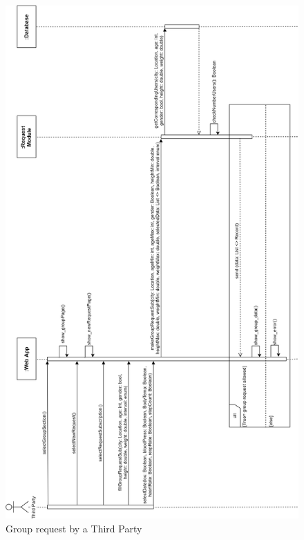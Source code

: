 \begin{figure}[H]
    \centering
    \includegraphics[scale=0.2]{DD/Pictures/groupRequestSeqDiagDDV.png}
    \caption{Group request by a Third Party}
\end{figure}

